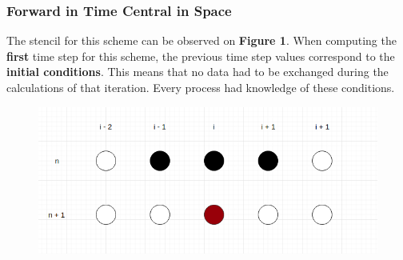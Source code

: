 \documentclass[12pt]{article}
\begin{document}
\subsubsection*{Forward in Time Central in Space}

\par The stencil for this scheme can be observed on \textbf{Figure 1}. When computing the \textbf{first} time step for this scheme, the previous time step values correspond to the \textbf{initial conditions}. This means that no data had to be exchanged during the calculations of that iteration. Every process had knowledge of these conditions.

\begin{figure}[!htb]
  \centering
  \includegraphics[width=.6\linewidth]{FTCS.png}
\end{figure}
\end{document}
